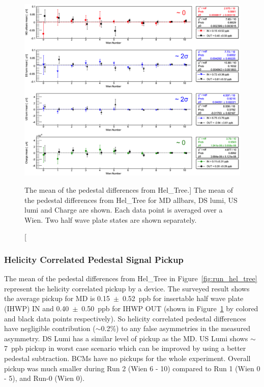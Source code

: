 \begin{singlespace}
\begin{figure}[!h]
	\centering
	\includegraphics[width=15.0cm]{figures/differencesSum}	
	\caption
	[The mean of the pedestal differences from Hel\_Tree.]
	{The mean of the pedestal differences from Hel\_Tree for MD allbars, DS lumi, US lumi and Charge are shown. Each data point is averaged over a Wien. Two half wave plate states are shown separately.}
	\label{fig:differencesSum}
\end{figure}
\end{singlespace}

\subsubsection{Helicity Correlated Pedestal Signal Pickup}
\label{Helicity Correlated Pedestal Signal Pickup}
The mean of the pedestal differences from Hel\_Tree in Figure~\ref{fig:run_hel_tree} represent the helicity correlated pickup by a device. The surveyed result shows the average pickup for MD is 0.15~$\pm$~0.52~ppb for insertable half wave plate (IHWP) IN and 0.40~$\pm$~0.50~ppb for IHWP OUT (shown in Figure~\ref{fig:differencesSum} by colored and black data points respectively). So helicity correlated pedestal differences have negligible contribution ($\sim$0.2\%) to any false asymmetries in the measured asymmetry. DS Lumi has a similar level of pickup as the MD. US Lumi shows $\sim$7~ppb pickup in worst case scenario which can be improved by using a better pedestal subtraction. BCMs have no pickups for the whole experiment. Overall pickup was much smaller during Run 2 (Wien 6 - 10) compared to Run 1 (Wien 0 - 5), and Run-0 (Wien 0). 

